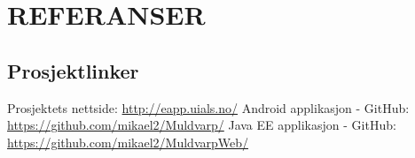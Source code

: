 \documentclass[../main.tex]{subfiles}
\begin{document}
\chapter{REFERANSER}
\renewcommand{\listfigurename}{Figurliste}
\renewcommand{\listtablename}{Tabelliste}
\renewcommand*{\lstlistlistingname}{Kodesnutter}
\theendnotes

\listoffigures

\listoftables

\lstlistoflistings

\section{Prosjektlinker}
Prosjektets nettside: \url{http://eapp.uials.no/} \newline
Android applikasjon - GitHub: \url{https://github.com/mikael2/Muldvarp/} \newline
Java EE applikasjon - GitHub: \url{https://github.com/mikael2/MuldvarpWeb/} \newline

\newpage
\end{document}

